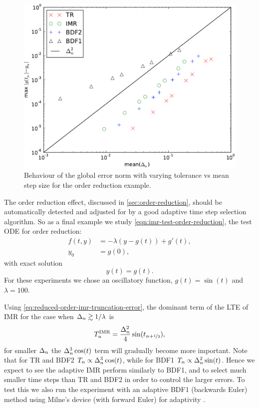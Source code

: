 \begin{figure}
  \centering  \includegraphics[width=1\textwidth]{plots/aimr_odes/order_reduction-maxoferrornormsvsmeanofdts.pdf}
  \caption{Behaviour of the global error norm with varying tolerance vs mean step size for the order reduction example.}
  \label{fig:imr-order-reduction-convergence}
\end{figure}

The order reduction effect, discussed in \cref{sec:order-reduction}, should be automatically detected and adjusted for by a good adaptive time step selection algorithm.
So as a final example we study \cref{eqn:imr-test-order-reduction}, the test ODE for order reduction:
\begin{equation}
  \begin{aligned}
    f(t, y) &= -\lambda (y - g(t)) + g'(t), \\
    y_0 &= g(0),
  \end{aligned}
\end{equation}
with exact solution
\begin{equation}
  y(t) = g(t).
\end{equation}
For these experiments we chose an oscillatory function, $g(t) = \sin(t)$ and $\lambda = 100$.

Using \cref{eq:reduced-order-imr-truncation-error}, the dominant term of the LTE of IMR for the case when $\Delta_{n} \gtrsim 1/\lambda$ is
\begin{equation}
  T_n^{\mathrm{IMR}} = \frac{\Delta_{n}^2}{4} \sin(t_{n+\nicefrac{1}{2}}),
\end{equation}
for smaller $\Delta_{n}$ the $\Delta_{n}^3 \cos(t)$ term will gradually become more important.
Note that for TR and BDF2 $T_n \propto \Delta_{n}^3 \cos(t)$, while for BDF1 $T_n \propto \Delta_{n}^2 \sin(t)$.
Hence we expect to see the adaptive IMR perform similarly to BDF1, and to select much smaller time steps than TR and BDF2 in order to control the larger errors.
To test this we also run the experiment with an adaptive BDF1 (backwards Euler) method using Milne's device (with forward Euler) for adaptivity \cite[270]{GreshoSani}.

